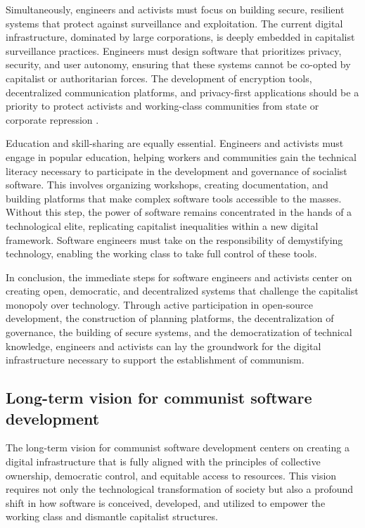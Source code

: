 \begin{refsection}
Simultaneously, engineers and activists must focus on building secure, resilient systems that protect against surveillance and exploitation. The current digital infrastructure, dominated by large corporations, is deeply embedded in capitalist surveillance practices. Engineers must design software that prioritizes privacy, security, and user autonomy, ensuring that these systems cannot be co-opted by capitalist or authoritarian forces. The development of encryption tools, decentralized communication platforms, and privacy-first applications should be a priority to protect activists and working-class communities from state or corporate repression \cite[pp.~89-91]{snowden2019}.

Education and skill-sharing are equally essential. Engineers and activists must engage in popular education, helping workers and communities gain the technical literacy necessary to participate in the development and governance of socialist software. This involves organizing workshops, creating documentation, and building platforms that make complex software tools accessible to the masses. Without this step, the power of software remains concentrated in the hands of a technological elite, replicating capitalist inequalities within a new digital framework. Software engineers must take on the responsibility of demystifying technology, enabling the working class to take full control of these tools.

In conclusion, the immediate steps for software engineers and activists center on creating open, democratic, and decentralized systems that challenge the capitalist monopoly over technology. Through active participation in open-source development, the construction of planning platforms, the decentralization of governance, the building of secure systems, and the democratization of technical knowledge, engineers and activists can lay the groundwork for the digital infrastructure necessary to support the establishment of communism.

\subsection{Long-term vision for communist software development}

The long-term vision for communist software development centers on creating a digital infrastructure that is fully aligned with the principles of collective ownership, democratic control, and equitable access to resources. This vision requires not only the technological transformation of society but also a profound shift in how software is conceived, developed, and utilized to empower the working class and dismantle capitalist structures.


\end{refsection}
